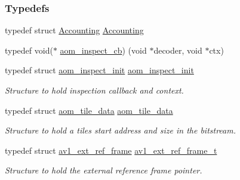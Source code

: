 \subsubsection*{Typedefs}
\begin{DoxyCompactItemize}
\item 
typedef struct \hyperlink{group__aom__decoder_ga4e755ba2db79154311994183ad9e4b28}{Accounting} \hyperlink{group__aom__decoder_ga4e755ba2db79154311994183ad9e4b28}{Accounting}
\item 
typedef void($\ast$ \hyperlink{group__aom__decoder_ga1b37b4b76004e5a2776c2e2f16b052cd}{aom\+\_\+inspect\+\_\+cb}) (void $\ast$decoder, void $\ast$ctx)
\item 
typedef struct \hyperlink{structaom__inspect__init}{aom\+\_\+inspect\+\_\+init} \hyperlink{group__aom__decoder_gacb9e1c8988786bd40511f75106785f6d}{aom\+\_\+inspect\+\_\+init}
\begin{DoxyCompactList}\small\item\em Structure to hold inspection callback and context. \end{DoxyCompactList}\item 
typedef struct \hyperlink{structaom__tile__data}{aom\+\_\+tile\+\_\+data} \hyperlink{group__aom__decoder_ga9a0f96778a43917403e5163338bc1554}{aom\+\_\+tile\+\_\+data}
\begin{DoxyCompactList}\small\item\em Structure to hold a tile\textquotesingle{}s start address and size in the bitstream. \end{DoxyCompactList}\item 
typedef struct \hyperlink{structav1__ext__ref__frame}{av1\+\_\+ext\+\_\+ref\+\_\+frame} \hyperlink{group__aom__decoder_ga83fa00a891fa821cd5eb1c15ffd7287b}{av1\+\_\+ext\+\_\+ref\+\_\+frame\+\_\+t}
\begin{DoxyCompactList}\small\item\em Structure to hold the external reference frame pointer. \end{DoxyCompactList}\end{DoxyCompactItemize}
